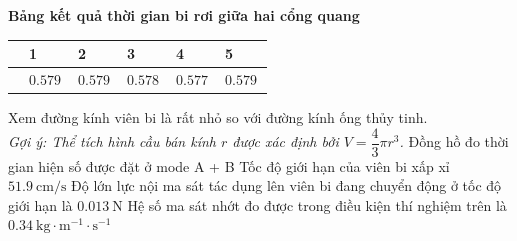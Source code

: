 \begin{ex}
	\begin{center}
		\textbf{Bảng kết quả thời gian bi rơi giữa hai cổng quang}\\
		\begin{tabular}{|M{4cm}|M{2cm}|M{2cm}|M{2cm}|M{2cm}|M{2cm}|}
			\hline
			 & 1& 2 & 3 & 4 & 5 \\
			\hline
			 & $\SI{0.579}{}$ & $\SI{0.579}{}$ & $\SI{0.578}{}$ & $\SI{0.577}{}$ & $\SI{0.579}{}$\\
			\hline
		\end{tabular}
	\end{center}
	Xem đường kính viên bi là rất nhỏ so với đường kính ống thủy tinh.\\
	\textit{Gợi ý: Thể tích hình cầu bán kính $r$ được xác định bởi $V=\dfrac{4}{3}\pi r^3$.}
	\choiceTF
	{Đồng hồ đo thời gian hiện số được đặt ở mode A + B}
	{\True Tốc độ giới hạn của viên bi xấp xỉ $\SI{51.9}{\centi\meter/\second}$}
	{Độ lớn lực nội ma sát tác dụng lên viên bi đang chuyển động ở tốc độ giới hạn là $\SI{0.013}{\newton}$}
	{\True Hệ số ma sát nhớt đo được trong điều kiện thí nghiệm trên là $\SI{0.34}{\kilogram\cdot\meter^{-1}\cdot\second^{-1}}$}

	\loigiai{}
\end{ex}
